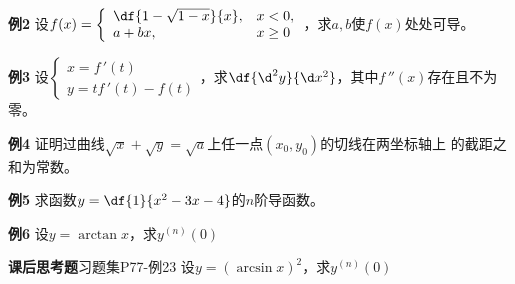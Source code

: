 \begin{frame}
	\linespread{1.5}
	\begin{exampleblock}{{\bf 例2}\hfill }
		设$f(x)=\left\{\begin{array}{ll}
		\df{1-\sqrt{1-x}}{x}, & x<0,\\
		a+bx, & x\geq 0
		\end{array}\right.$，求$a,b$使$f(x)$处处可导。
	\end{exampleblock}\pause 
	\begin{exampleblock}{{\bf 例3}\hfill }
		设$\left\{\begin{array}{l}
		x=f\,'(t)\\ y=tf\,'(t)-f(t)
		\end{array}\right.$，求$\df{\d^2y}{\d x^2}$，其中$f\,''(x)$存在且不为零。
	\end{exampleblock}
\end{frame}

\begin{frame}
	\linespread{1.5}\pause 
	\begin{exampleblock}{{\bf 例4}\hfill }
		证明过曲线$\sqrt x+\sqrt y=\sqrt a$上任一点$(x_0,y_0)$的切线在两坐标轴上
		的截距之和为常数。
	\end{exampleblock}\pause 
	\bigskip
	\begin{exampleblock}{{\bf 例5}\hfill }
		求函数$y=\df{1}{x^2-3x-4}$的$n$阶导函数。
	\end{exampleblock}\pause 
\end{frame}

\begin{frame}
	\linespread{1.5}\pause 
	\begin{exampleblock}{{\bf 例6}\hfill }
		设$y=\arctan x$，求$y^{(n)}(0)$
	\end{exampleblock}\pause 
	\bigskip
	\begin{exampleblock}{{\bf 课后思考题}\hfill 习题集P77-例23}
		设$y=(\arcsin x)^2$，求$y^{(n)}(0)$
	\end{exampleblock}
\end{frame}


